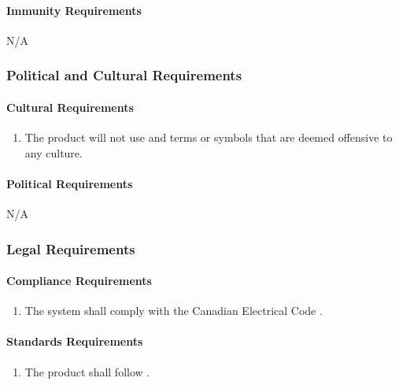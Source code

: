 \documentclass[12pt]{article}
\begin{document}
\paragraph{Immunity Requirements}
N/A



\subsubsection{Political and Cultural Requirements}
\label{NFR_PC}
\paragraph{Cultural Requirements}
\begin{enumerate}[{PC}1., leftmargin=2\parindent]
    \item The product will not use and terms or symbols that are deemed offensive to any culture.
\end{enumerate}

\paragraph{Political Requirements}
N/A



\subsubsection{Legal Requirements}
\label{NFR_Legal}
\paragraph{Compliance Requirements}
\begin{enumerate}[{LR}1., leftmargin=2\parindent]
    \item The system shall comply with the Canadian Electrical Code \cite{CanadianElectricalCode2021}.
\end{enumerate}

\paragraph{Standards Requirements}
\begin{enumerate}[{LR}1., leftmargin=2\parindent, resume]
    \item The product shall follow \cite{WCAG2018}.
\end{enumerate}
\end{document}
